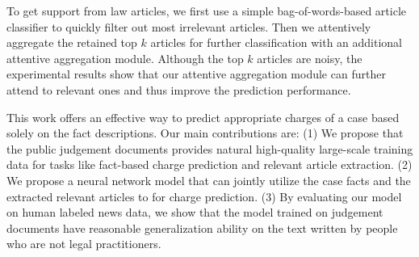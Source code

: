 To get support from law articles, we first use a simple bag-of-words-based article classifier to quickly filter out most irrelevant articles. Then we attentively aggregate the retained top $k$ articles for further classification with an additional attentive aggregation module.
Although the top $k$ articles are noisy, the experimental results show that our attentive aggregation module can further attend to relevant ones and thus improve the prediction performance. 

This work offers an effective way to predict appropriate charges of a case based solely on the fact descriptions. Our main contributions are: (1) We propose that the public judgement documents provides natural high-quality large-scale training data for tasks like fact-based charge prediction and relevant article extraction. (2) We propose a neural network model that can jointly utilize the case facts and the extracted relevant articles to for charge prediction. (3) By evaluating our model on human labeled news data, we show that the model trained on judgement documents have reasonable generalization ability on the text written by people who are not legal practitioners. 



